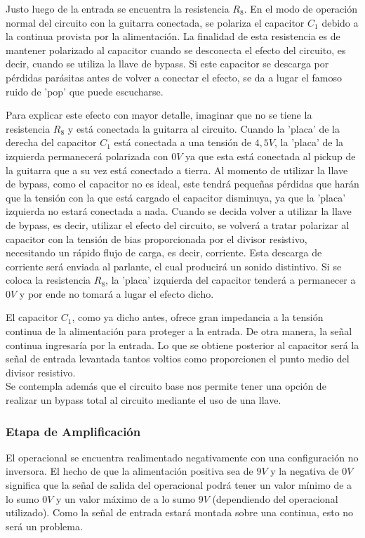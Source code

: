 Justo luego de la entrada se encuentra la resistencia $R_8$. En el modo de operación normal del circuito con la guitarra conectada, se polariza el capacitor $C_1$ debido a la continua provista por la alimentación. La finalidad de esta resistencia es de mantener polarizado al capacitor cuando se desconecta el efecto del circuito, es decir, cuando se utiliza la llave de bypass. Si este capacitor se descarga por pérdidas parásitas antes de volver a conectar el efecto, se da a lugar el famoso ruido de 'pop' que puede escucharse.

Para explicar este efecto con mayor detalle, imaginar que no se tiene la resistencia $R_8$ y está conectada la guitarra al circuito. Cuando la 'placa' de la derecha del capacitor $C_1$ está conectada a una tensión de $4,5V$, la 'placa' de la izquierda permanecerá polarizada con $0V$ ya que esta está conectada al pickup de la guitarra que a su vez está conectado a tierra. Al momento de utilizar la llave de bypass, como el capacitor no es ideal, este tendrá pequeñas pérdidas que harán que la tensión con la que está cargado el capacitor disminuya, ya que la 'placa' izquierda no estará conectada a nada. Cuando se decida volver a utilizar la llave de bypass, es decir, utilizar el efecto del circuito, se volverá a tratar polarizar al capacitor con la tensión de bias proporcionada por el divisor resistivo, necesitando un rápido flujo de carga, es decir, corriente. Esta descarga de corriente será enviada al parlante, el cual producirá un sonido distintivo. Si se coloca la resistencia $R_8$, la 'placa' izquierda del capacitor tenderá a permanecer a $0V$ y por ende no tomará a lugar el efecto dicho.

El capacitor $C_1$, como ya dicho antes, ofrece gran impedancia a la tensión continua de la alimentación para proteger a la entrada. De otra manera, la señal continua ingresaría por la entrada.
Lo que se obtiene posterior al capacitor será la señal de entrada levantada tantos voltios como proporcionen el punto medio del divisor resistivo.\\

Se contempla además que el circuito base nos permite tener una opción de realizar un bypass total al circuito mediante el uso de una llave.

\subsubsection{Etapa de Amplificación}

El operacional se encuentra realimentado negativamente con una configuración no inversora. El hecho de que la alimentación positiva sea de $9V$ y la negativa de $0V$ significa que la señal de salida del operacional podrá tener un valor mínimo de a lo sumo $0V$ y un valor máximo de a lo sumo $9V$ (dependiendo del operacional utilizado). Como la señal de entrada estará montada sobre una continua, esto no será un problema.

